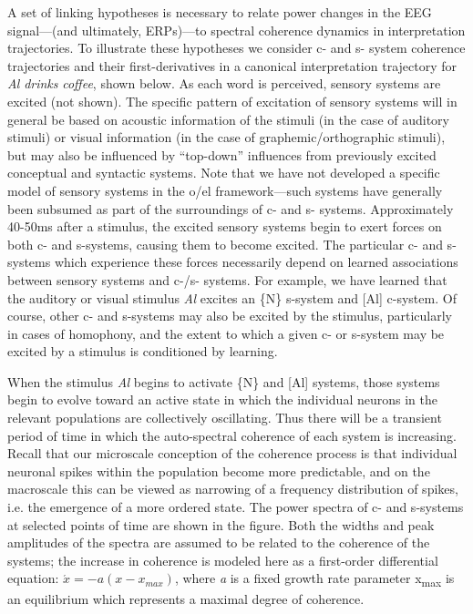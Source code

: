 A set of linking hypotheses is necessary to relate power changes in the EEG signal—(and ultimately, ERPs)—to spectral coherence dynamics in interpretation trajectories. To illustrate these hypotheses we consider c- and s- system coherence trajectories and their first-derivatives in a canonical interpretation trajectory for \textit{Al} \textit{drinks} \textit{coffee}, shown below. As each word is perceived, sensory systems are excited (not shown). The specific pattern of excitation of sensory systems will in general be based on acoustic information of the stimuli (in the case of auditory stimuli) or visual information (in the case of graphemic/orthographic stimuli), but may also be influenced by “top-down” influences from previously excited conceptual and syntactic systems. Note that we have not developed a specific model of sensory systems in the o/el framework—such systems have generally been subsumed as part of the surroundings of c- and s- systems. Approximately 40-50ms after a stimulus, the excited sensory systems begin to exert forces on both c- and s-systems, causing them to become excited. The particular c- and s-systems which experience these forces necessarily depend on learned associations between sensory systems and c-/s- systems. For example, we have learned that the auditory or visual stimulus \textit{Al} excites an \{N\} s-system and [Al] c-system. Of course, other c- and s-systems may also be excited by the stimulus, particularly in cases of homophony, and the extent to which a given c- or s-system may be excited by a stimulus is conditioned by learning.

  When the stimulus \textit{Al} begins to activate \{N\} and [Al] systems, those systems begin to evolve toward an active state in which the individual neurons in the relevant populations are collectively oscillating. Thus there will be a transient period of time in which the auto-spectral coherence of each system is increasing. Recall that our microscale conception of the coherence process is that individual neuronal spikes within the population become more predictable, and on the macroscale this can be viewed as narrowing of a frequency distribution of spikes, i.e. the emergence of a more ordered state. The power spectra of c- and s-systems at selected points of time are shown in the figure. Both the widths and peak amplitudes of the spectra are assumed to be related to the coherence of the systems; the increase in coherence is modeled here as a first-order differential equation:  $\acute{{x}}=-a\left(x-{x}_{\mathit{max}}\right)$, where \textit{a} is a fixed growth rate parameter x\textsubscript{max} is an equilibrium which represents a maximal degree of coherence. 

